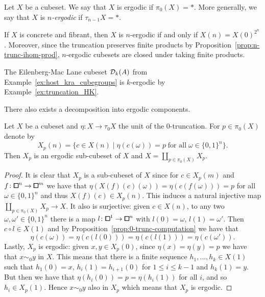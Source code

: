 \begin{definition}\label{def:ergodic}
Let $X$ be a cubeset.
We say that $X$ is ergodic if $\pi_0(X) = \ast$.
More generally, we say that $X$ is \emph{$n$-ergodic} if $\tau_{n-1}X = \ast$.
\end{definition}

\begin{remark}
If $X$ is concrete and fibrant, then $X$ is $n$-ergodic if and only if $X(n) = X(0)^{2^n}$.
Moreover, since the truncation preserves finite products by Proposition~\ref{prop:n-trunc-ihom-prod},
$n$-ergodic cubesets are closed under taking finite products.
\end{remark}

\begin{example}\label{ex:EM_k_ergodic}
The Eilenberg-Mac Lane cubeset $\mathcal{D}_k(A)$ from Example~\ref{ex:host_kra_cubegroups} is $k$-ergodic
by Example~\ref{ex:truncation_HK}.
\end{example}

There also exists a decomposition into ergodic components.

\begin{proposition}\label{prop:ergodic-decomp}
Let $X$ be a cubeset and $\eta\colon X\to\tau_0X$ the unit of the $0$-truncation.
For $p\in\pi_0(X)$ denote by
\[
    X_p(n) = \{ c\in X(n) \mid \eta(c(\omega)) = p\;\text{for all}\;\omega\in\{0,1\}^n \}.
\]
Then $X_p$ is an ergodic sub-cubeset of $X$ and $X = \coprod_{p\in\pi_0(X)} X_p$.
\end{proposition}

\begin{proof}
It is clear that $X_p$ is a sub-cubeset of $X$ since for $c\in X_p(m)$ and $f\colon{\bbox}^n\to{\bbox}^m$
we have that $\eta(X(f)(c)(\omega)) = \eta(c(f(\omega))) = p$ for all $\omega\in\{0,1\}^n$
and thus $X(f)(c)\in X_p(n)$.
This induces a natural injective map $\coprod_{p\in\pi_0(X)} X_p\to X$.
It also is surjective: given $c\in X(n)$, to any two $\omega,\omega'\in\{0,1\}^n$
there is a map $l\colon{\bbox}^1\to{\bbox}^n$ with $l(0) = \omega$, $l(1) = \omega'$.
Then $c\circ l\in X(1)$ and by Proposition~\ref{prop:0-trunc-computation} we have that
\[
    \eta(c(\omega)) = \eta(c(l(0))) = \eta(c(l(1))) = \eta(c(\omega')).
\]
Lastly, $X_p$ is ergodic: given $x,y\in X_p(0)$, since $\eta(x) = \eta(y) = p$
we have that $x\sim_0 y$ in $X$.
This means that there is a finite sequence $h_1,\ldots,h_k\in X(1)$
such that $h_1(0) = x$, $h_i(1) = h_{i+1}(0)$ for $1\leq i\leq k-1$ and $h_k(1) = y$.
But then we have that $\eta(h_i(0)) = p = \eta(h_i(1))$ for all $i$,
and so $h_i\in X_p(1)$.
Hence $x\sim_0 y$ also in $X_p$ which means that $X_p$ is ergodic.
\end{proof}

